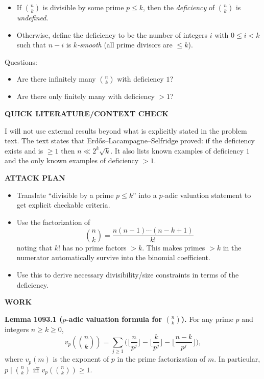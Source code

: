 \begin{itemize}
\item If $\binom{n}{k}$ is divisible by some prime $p\le k$, then the \emph{deficiency} of $\binom{n}{k}$ is \emph{undefined}.
\item Otherwise, define the deficiency to be the number of integers $i$ with $0\le i<k$ such that $n-i$ is \emph{$k$-smooth} (all prime divisors are $\le k$).
\end{itemize}

Questions:
\begin{itemize}
\item Are there infinitely many $\binom{n}{k}$ with deficiency $1$?
\item Are there only finitely many with deficiency $>1$?
\end{itemize}

\textbf{QUICK LITERATURE/CONTEXT CHECK}

I will not use external results beyond what is explicitly stated in the problem text.
The text states that Erd\H{o}s--Lacampagne--Selfridge proved: if the deficiency exists and is $\ge 1$ then $n\ll 2^k\sqrt{k}$.
It also lists known examples of deficiency $1$ and the only known examples of deficiency $>1$.

\textbf{ATTACK PLAN}

\begin{itemize}
\item Translate ``divisible by a prime $p\le k$'' into a $p$-adic valuation statement to get explicit checkable criteria.
\item Use the factorization of
\[\binom{n}{k}=\frac{n(n-1)\cdots(n-k+1)}{k!}
\]
noting that $k!$ has no prime factors $>k$.
This makes primes $>k$ in the numerator automatically survive into the binomial coefficient.
\item Use this to derive necessary divisibility/size constraints in terms of the deficiency.
\end{itemize}

\textbf{WORK}

\textbf{Lemma 1093.1 ($p$-adic valuation formula for $\binom{n}{k}$).}
For any prime $p$ and integers $n\ge k\ge 0$,
\[v_p\!\left(\binom{n}{k}\right)=\sum_{j\ge 1}\Big(\Big\lfloor\frac{n}{p^j}\Big\rfloor-\Big\lfloor\frac{k}{p^j}\Big\rfloor-\Big\lfloor\frac{n-k}{p^j}\Big\rfloor\Big),
\]
where $v_p(m)$ is the exponent of $p$ in the prime factorization of $m$.
In particular, $p\mid \binom{n}{k}$ iff $v_p\!\left(\binom{n}{k}\right)\ge 1$.

